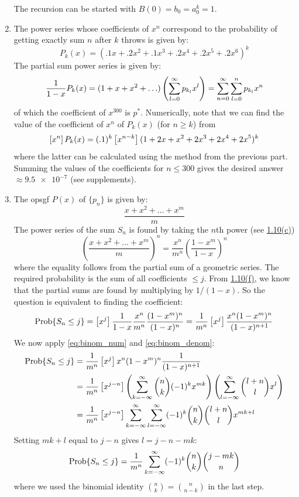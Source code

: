\begin{solution}
\begin{enumerate}[label=(\alph*)]
\[        \]
        The recursion can be started with $B(0) = b_0 = a_0^k = 1$.
        \item \hypertarget{eq:ch1:10:f}{} The power series whose coefficients of $x^n$ correspond to the probability of getting exactly sum $n$ after $k$ throws is given by:
        \[
            P_k(x) = (.1x + .2x^2 + .1x^3 + .2x^4 + .2x^5 + .2x^6)^k
        \]
        The partial sum power series is given by:
        \[
            \frac{1}{1-x}P_k(x) = (1 + x + x^2 + \ldots)\left(\sum_{l=0}^\infty p_{k_l}x^l \right) = \bsum \sum_{l=0}^n p_{k_l} x^n 
        \]
        of which the coefficient of $x^{300}$ is $p^*$. Numerically, note that we can find the value of the coefficient of $x^n$ of $P_k(x)$ (for $n\geq k$) from
        \[
            \coeff{x^n}P_k(x) = (.1)^k \coeff{x^{n-k}}  (1 + 2x + x^2 + 2x^3 + 2x^4 + 2x^5)^k
        \]
        where the latter can be calculated using the method from the previous part. Summing the values of the coefficients for $n \leq 300$ gives the desired answer $\approx \num{9.5e-7}$ (see supplements).
        \item The opsgf $P(x)$ of $\{p_n\}$ is given by:
        \[
            \frac{x+x^2+\ldots+x^m}{m}
        \]
        The power series of the sum $S_n$ is found by taking the $n$th power (see \hyperlink{eq:ch1:10:c}{1.10(c)})
        \[
            \left(\frac{x+x^2+\ldots+x^m}{m}\right)^n = \frac{x^n}{m^n}\left(\frac{1 - x^m}{1-x}\right)^n
        \]
        where the equality follows from the partial sum of a geometric series. The required probability is the sum of all coefficients $\leq j$. From \hyperlink{eq:ch1:10:f}{1.10(f)}, we know that the partial sums are found by multiplying by $1/(1-x)$. So the question is equivalent to finding the coefficient:
        \[
            \prob\{S_n\leq j\} = \coeff{x^j} \frac{1}{1-x} \frac{x^n}{m^n} \frac{(1-x^m)^n}{(1-x)^n} = \frac{1}{m^n}\coeff{x^j} \frac{x^n(1-x^m)^n}{(1-x)^{n+1}}
        \]
        We now apply \eqref{eq:binom_num} and \eqref{eq:binom_denom}:
        \begin{align*}
            \prob\{S_n\leq j\} &= \frac{1}{m^n}\coeff{x^{j}} x^n(1-x^m)^n \frac{1}{(1-x)^{n+1}} \\
            &= \frac{1}{m^n} \coeff{x^{j-n}} \left(\infsum[k] \binom{n}{k} (-1)^kx^{mk}\right)\left( \infsum[l] \binom{l+n}{l}x^l\right) \\
            &= \frac{1}{m^n} \coeff{x^{j-n}} \infsum[k]\infsum[l](-1)^k\binom{n}{k}\binom{l+n}{l}x^{mk + l}
        \end{align*}
        Setting $mk+l$ equal to $j-n$ gives $l=j-n-mk$:
        \[
            \prob\{S_n\leq j\} = \frac{1}{m^n} \infsum[k] (-1)^k\binom{n}{k}\binom{j-mk}{n}
        \]
        where we used the binomial identity $\binom{n}{k} = \binom{n}{n-k}$ in the last step.
    \end{enumerate}
\end{solution}

